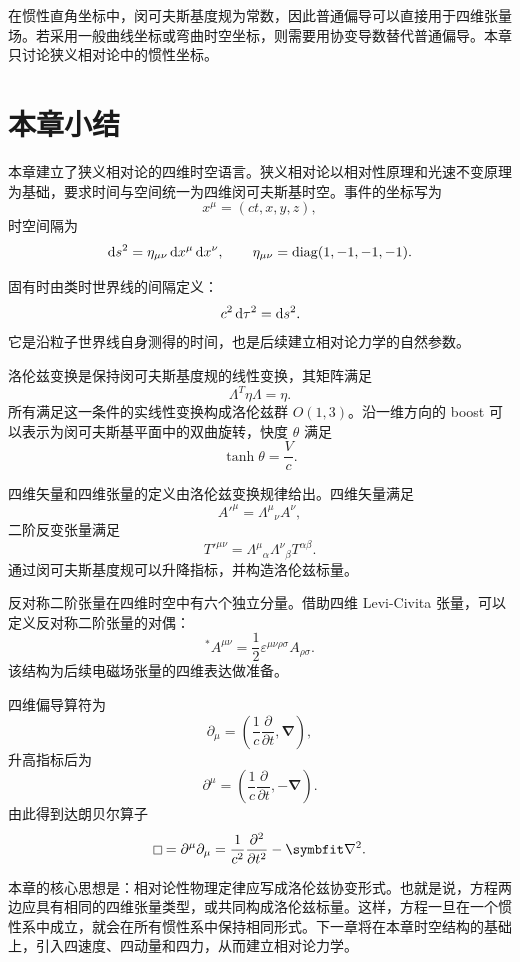 在惯性直角坐标中，闵可夫斯基度规为常数，因此普通偏导可以直接用于四维张量场。若采用一般曲线坐标或弯曲时空坐标，则需要用协变导数替代普通偏导。本章只讨论狭义相对论中的惯性坐标。

\section{本章小结}

本章建立了狭义相对论的四维时空语言。狭义相对论以相对性原理和光速不变原理为基础，要求时间与空间统一为四维闵可夫斯基时空。事件的坐标写为
\[
x^{\mu}=(ct,x,y,z),
\]
时空间隔为
\[
\mathop{}\!\mathrm{d} s^{2}=\eta_{\mu\nu}\mathop{}\!\mathrm{d} x^{\mu}\mathop{}\!\mathrm{d} x^{\nu},
\qquad
\eta_{\mu\nu}=\mathrm{diag}(1,-1,-1,-1).
\]

固有时由类时世界线的间隔定义：
\[
c^{2}\mathop{}\!\mathrm{d}\tau^{2}=\mathop{}\!\mathrm{d} s^{2}.
\]
它是沿粒子世界线自身测得的时间，也是后续建立相对论力学的自然参数。

洛伦兹变换是保持闵可夫斯基度规的线性变换，其矩阵满足
\[
\Lambda^{T}\eta\Lambda=\eta.
\]
所有满足这一条件的实线性变换构成洛伦兹群 $O(1,3)$。沿一维方向的 boost 可以表示为闵可夫斯基平面中的双曲旋转，快度 $\theta$ 满足
\[
\tanh\theta=\frac{V}{c}.
\]

四维矢量和四维张量的定义由洛伦兹变换规律给出。四维矢量满足
\[
A'^{\mu}=\Lambda^{\mu}{}_{\nu} A^{\nu},
\]
二阶反变张量满足
\[
T'^{\mu\nu}=
\Lambda^{\mu}{}_{\alpha}\Lambda^{\nu}{}_{\beta}T^{\alpha\beta}.
\]
通过闵可夫斯基度规可以升降指标，并构造洛伦兹标量。

反对称二阶张量在四维时空中有六个独立分量。借助四维 Levi-Civita 张量，可以定义反对称二阶张量的对偶：
\[
{}^{*}A^{\mu\nu}
=
\frac{1}{2}\varepsilon^{\mu\nu\rho\sigma}A_{\rho\sigma}.
\]
该结构为后续电磁场张量的四维表达做准备。

四维偏导算符为
\[
\partial_{\mu}=
\left(
\frac{1}{c}\frac{\partial}{\partial t},\bm{\nabla}
\right),
\]
升高指标后为
\[
\partial^{\mu}=
\left(
\frac{1}{c}\frac{\partial}{\partial t},-\bm{\nabla}
\right).
\]
由此得到达朗贝尔算子
\[
\dalembert =\partial^{\mu}\partial_{\mu}
=
\frac{1}{c^{2}}\frac{\partial^{2}}{\partial t^{2}}-\bm{\nabla}^{2}.
\]

本章的核心思想是：相对论性物理定律应写成洛伦兹协变形式。也就是说，方程两边应具有相同的四维张量类型，或共同构成洛伦兹标量。这样，方程一旦在一个惯性系中成立，就会在所有惯性系中保持相同形式。下一章将在本章时空结构的基础上，引入四速度、四动量和四力，从而建立相对论力学。
